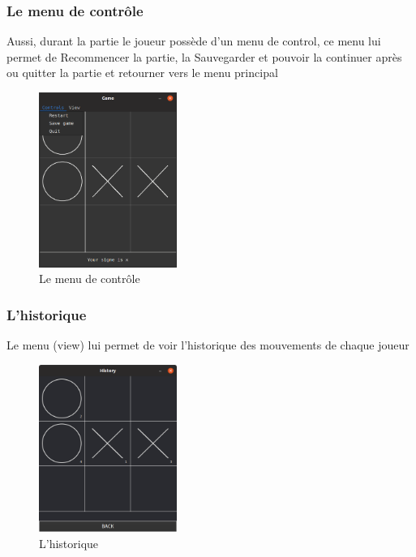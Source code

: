 \subsubsection{Le menu de contrôle}
Aussi, durant la partie le joueur possède d’un menu de control, ce menu lui permet de Recommencer la partie, la Sauvegarder et pouvoir la continuer après ou quitter la partie et retourner vers le menu principal 
\begin{figure}[H]
	\centering
	\includegraphics[width=0.4\textwidth]{control menu.PNG}
	  \caption{Le menu de contrôle}
	\label{fig:Le menu de contrôle}
\end{figure}
\subsubsection{L'historique}
Le menu (view) lui permet de voir l’historique des mouvements de chaque joueur 
\begin{figure}[H]
	\centering
	\includegraphics[width=0.4\textwidth]{history page.PNG}
	  \caption{L'historique}
	\label{fig:L'historique}
\end{figure}

